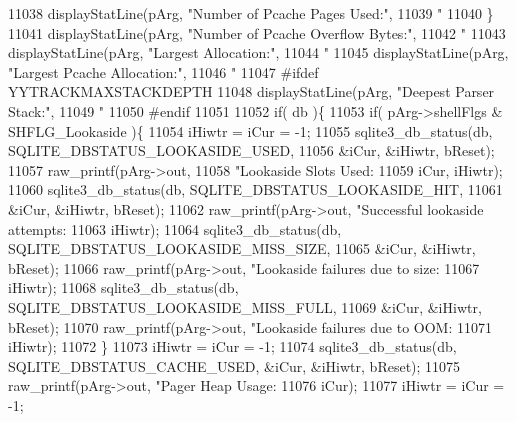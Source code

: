 \begin{DoxyCode}
{{{{{{{{{11038     displayStatLine(pArg, \textcolor{stringliteral}{"Number of Pcache Pages Used:"},
11039        \textcolor{stringliteral}{"%
11040   \}
11041   displayStatLine(pArg, \textcolor{stringliteral}{"Number of Pcache Overflow Bytes:"},
11042      \textcolor{stringliteral}{"%
11043   displayStatLine(pArg, \textcolor{stringliteral}{"Largest Allocation:"},
11044      \textcolor{stringliteral}{"%
11045   displayStatLine(pArg, \textcolor{stringliteral}{"Largest Pcache Allocation:"},
11046      \textcolor{stringliteral}{"%
11047 \textcolor{preprocessor}{#ifdef YYTRACKMAXSTACKDEPTH}
11048   displayStatLine(pArg, \textcolor{stringliteral}{"Deepest Parser Stack:"},
11049      \textcolor{stringliteral}{"%
11050 \textcolor{preprocessor}{#endif}
11051 
11052   \textcolor{keywordflow}{if}( db )\{
11053     \textcolor{keywordflow}{if}( pArg->shellFlgs & SHFLG_Lookaside )\{
11054       iHiwtr = iCur = -1;
11055       sqlite3_db_status(db, SQLITE_DBSTATUS_LOOKASIDE_USED,
11056                         &iCur, &iHiwtr, bReset);
11057       raw_printf(pArg->out,
11058               \textcolor{stringliteral}{"Lookaside Slots Used:                %
11059               iCur, iHiwtr);
11060       sqlite3_db_status(db, SQLITE_DBSTATUS_LOOKASIDE_HIT,
11061                         &iCur, &iHiwtr, bReset);
11062       raw_printf(pArg->out, \textcolor{stringliteral}{"Successful lookaside attempts:       %
11063               iHiwtr);
11064       sqlite3_db_status(db, SQLITE_DBSTATUS_LOOKASIDE_MISS_SIZE,
11065                         &iCur, &iHiwtr, bReset);
11066       raw_printf(pArg->out, \textcolor{stringliteral}{"Lookaside failures due to size:      %
11067               iHiwtr);
11068       sqlite3_db_status(db, SQLITE_DBSTATUS_LOOKASIDE_MISS_FULL,
11069                         &iCur, &iHiwtr, bReset);
11070       raw_printf(pArg->out, \textcolor{stringliteral}{"Lookaside failures due to OOM:       %
11071               iHiwtr);
11072     \}
11073     iHiwtr = iCur = -1;
11074     sqlite3_db_status(db, SQLITE_DBSTATUS_CACHE_USED, &iCur, &iHiwtr, bReset);
11075     raw_printf(pArg->out, \textcolor{stringliteral}{"Pager Heap Usage:                    %
11076             iCur);
11077     iHiwtr = iCur = -1;
}}}}}}}}}}}}}}}}}}}
\end{DoxyCode}
